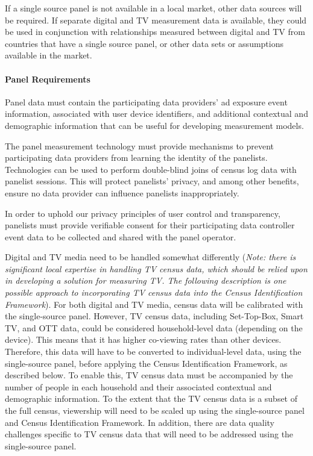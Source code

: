 \documentclass[]{article}
\let\oldparagraph\paragraph
\renewcommand{\paragraph}[1]{\oldparagraph{#1}\mbox{}}
\begin{document}
If a single source panel is not available in a local market, other data sources will be required. If separate digital and TV measurement data is available, they could be used in conjunction with relationships measured between digital and TV from countries that have a single source panel, or other data sets or assumptions available in the market.

\paragraph{Panel Requirements}

Panel data must contain the participating data providers' ad exposure event information, associated with user device identifiers, and additional contextual and demographic information that can be useful for developing measurement models.

The panel measurement technology must provide mechanisms to prevent participating data providers from learning the identity of the panelists. Technologies can be used to perform double-blind joins of census log data with panelist sessions. This will protect panelists' privacy, and among other benefits, ensure no data provider can influence panelists inappropriately.

In order to uphold our privacy principles of user control and transparency, panelists must provide verifiable consent for their participating data controller event data to be collected and shared with the panel operator.

Digital and TV media need to be handled somewhat differently (\emph{Note: there is significant local expertise in handling TV census data, which should be relied upon in developing a solution for measuring
TV. The following description is one possible approach to incorporating TV census data into the Census Identification Framework}). For both digital and TV media, census data will be calibrated with the single-source panel. However, TV census data, including Set-Top-Box, Smart TV, and OTT data, could be considered household-level data (depending on the device). This means that it has higher co-viewing rates than other devices. Therefore, this data will have to be converted to individual-level data, using the single-source panel, before applying the Census Identification Framework, as described below. To enable this,
TV census data must be accompanied by the number of people in each household and their associated contextual and demographic information. To the extent that the TV census data is a subset of the full census, viewership will need to be scaled up using the single-source panel and Census Identification Framework. In addition, there are data quality challenges specific to TV census data that will need to be addressed using the single-source panel.
\end{document}
